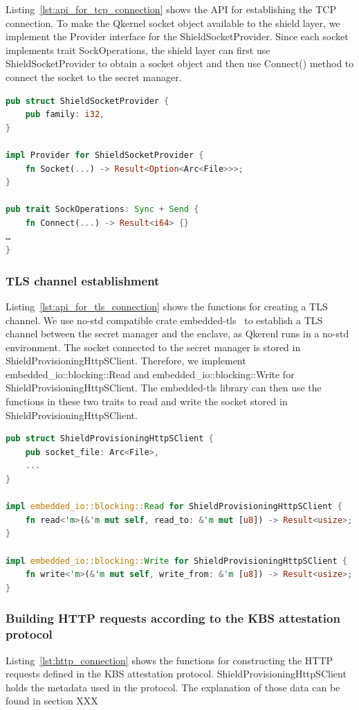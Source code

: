 Listing~\ref{lst:api_for_tcp_connection} shows the API for establishing the TCP connection. To make the Qkernel socket object available to the shield layer, we implement the Provider interface for the ShieldSocketProvider. Since each socket implements trait SockOperations, the shield layer can first use ShieldSocketProvider to 
obtain a socket object and then use Connect() method to connect the socket to the secret manager.

\begin{lstlisting}[language=rust, caption= API for establishing the TCP connection, label={lst:api_for_tcp_connection}]
pub struct ShieldSocketProvider {
    pub family: i32,
}

impl Provider for ShieldSocketProvider {
    fn Socket(...) -> Result<Option<Arc<File>>>;
}

pub trait SockOperations: Sync + Send {
    fn Connect(...) -> Result<i64> {}
…
}    
\end{lstlisting}

\subsubsection{TLS channel establishment}
Listing~\ref{lst:api_for_tls_connection} shows the functions for creating a TLS channel. We use no-std compatible crate embedded-tls~\cite*{embede_tls}  to establish a TLS channel between the secret manager and the enclave, as Qkerenl runs in a no-std environment. The socket connected to the secret manager is stored in 
ShieldProvisioningHttpSClient. Therefore, we implement embedded\_io::blocking::Read and embedded\_io::blocking::Write for ShieldProvisioningHttpSClient. The embedded-tls library can then use the functions in these two traits to read and write 
the socket stored in ShieldProvisioningHttpSClient.

\begin{lstlisting}[language=rust, caption= API for establishing the TCP connection, label={lst:api_for_tls_connection}]
pub struct ShieldProvisioningHttpSClient {
    pub socket_file: Arc<File>,
    ...
}

impl embedded_io::blocking::Read for ShieldProvisioningHttpSClient {
    fn read<'m>(&'m mut self, read_to: &'m mut [u8]) -> Result<usize>;
}

impl embedded_io::blocking::Write for ShieldProvisioningHttpSClient {
    fn write<'m>(&'m mut self, write_from: &'m [u8]) -> Result<usize>;
}
\end{lstlisting}
\subsubsection{Building HTTP requests according to the KBS attestation protocol}
Listing~\ref{lst:http_connection} shows the functions for constructing the HTTP requests defined in the KBS attestation protocol. ShieldProvisioningHttpSClient holds the metadata used in the protocol. The explanation of those data can be found in section XXX

